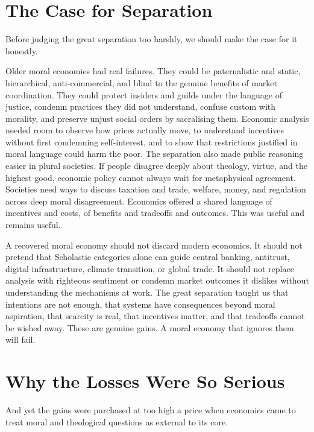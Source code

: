 \documentclass[11pt,a4paper,oneside]{book}
\begin{document}
\section*{The Case for Separation}

Before judging the great separation too harshly, we should make the case for it honestly.

Older moral economies had real failures. They could be paternalistic and static, hierarchical, anti-commercial, and blind to the genuine benefits of market coordination. They could protect insiders and guilds under the language of justice, condemn practices they did not understand, confuse custom with morality, and preserve unjust social orders by sacralising them. Economic analysis needed room to observe how prices actually move, to understand incentives without first condemning self-interest, and to show that restrictions justified in moral language could harm the poor. The separation also made public reasoning easier in plural societies. If people disagree deeply about theology, virtue, and the highest good, economic policy cannot always wait for metaphysical agreement. Societies need ways to discuss taxation and trade, welfare, money, and regulation across deep moral disagreement. Economics offered a shared language of incentives and costs, of benefits and tradeoffs and outcomes. This was useful and remains useful.

A recovered moral economy should not discard modern economics. It should not pretend that Scholastic categories alone can guide central banking, antitrust, digital infrastructure, climate transition, or global trade. It should not replace analysis with righteous sentiment or condemn market outcomes it dislikes without understanding the mechanisms at work. The great separation taught us that intentions are not enough, that systems have consequences beyond moral aspiration, that scarcity is real, that incentives matter, and that tradeoffs cannot be wished away. These are genuine gains. A moral economy that ignores them will fail.

\section*{Why the Losses Were So Serious}

And yet the gains were purchased at too high a price when economics came to treat moral and theological questions as external to its core.
\end{document}
